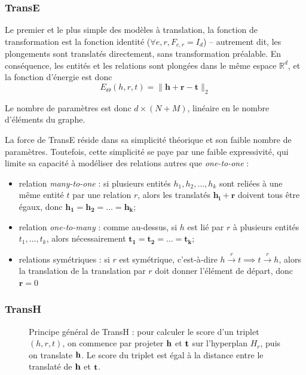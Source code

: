 \subsubsection{TransE \cite{bordes2013translating}}
Le premier et le plus simple des modèles à translation, la fonction de transformation est la fonction identité ($\forall e, r, F_{e, r} = I_d$) – autrement dit, les plongements sont translatés directement, sans transformation préalable. En conséquence, les entités et les relations sont plongées dans le même espace $\mathbb{R}^d$, et la fonction d'énergie est donc
\begin{equation}
    E_\Theta(h, r, t) = \| \mathbf{h + r - t} \|_2
    \label{eq:transe-main}
\end{equation}

Le nombre de paramètres est donc $d \times (N + M)$, linéaire en le nombre d'éléments du graphe. 

La force de TransE réside dans sa simplicité théorique et son faible nombre de paramètres. Toutefois, cette simplicité se paye par une faible expressivité, qui limite sa capacité à modéliser des relations autres que \textit{one-to-one} :
\begin{itemize}
    \item relation \textit{many-to-one} : si plusieurs entités $h_1, h_2, \ldots, h_k$ sont reliées à une même entité $t$ par une relation $r$, alors les translatés $\mathbf{h_i + r}$ doivent tous être égaux, donc $\mathbf{h_1  = h_2 = \ldots = h_k}$;
    \item relation \textit{one-to-many} : comme au-dessus, si $h$ est lié par $r$ à plusieurs entités $t_1, \ldots, t_k$, alors nécessairement $\mathbf{t_1 = t_2 = \ldots = t_k}$;
    \item relations symétriques : si $r$ est symétrique, c'est-à-dire $h  \overset{r} \rightarrow t \implies t   \overset{r} \rightarrow h$, alors la translation de la translation par $r$ doit donner l'élément de départ, donc $\mathbf{r} = 0$
\end{itemize}

\subsubsection{TransH \cite{fu2014learning}}

\begin{figure}[hbt]
    \centering
    
    \caption[Principe général de TransH]{Principe général de TransH : pour calculer le score d'un triplet $(h, r, t)$, on commence par projeter $\bf{h}$ et $\bf{t}$ sur l'hyperplan $H_r$, puis on translate $\bf{h}$. Le score du triplet est égal à la distance entre le translaté de $\bf{h}$ et $\bf{t}$.}
    \label{fig:transh}
\end{figure}

